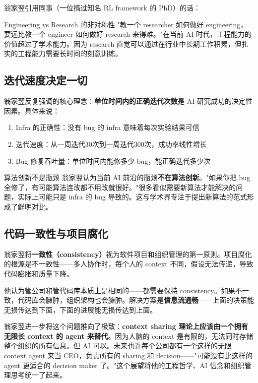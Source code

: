 \documentclass[a4paper]{article}
\begin{document}
翁家翌引用同事（一位搞过知名 RL framework 的 PhD）的话：

\begin{importantbox}{Engineering vs Research 的非对称性}
"教一个 researcher 如何做好 engineering，要远比教一个 engineer 如何做好 research 来得难。"在当前 AI 时代，工程能力的价值超过了学术能力。因为 research 直觉可以通过在行业中长期工作积累，但扎实的工程能力需要长时间的刻意训练。
\end{importantbox}

\subsection{迭代速度决定一切}

翁家翌反复强调的核心理念：\textbf{单位时间内的正确迭代次数}是 AI 研究成功的决定性因素。具体来说：

\begin{enumerate}
    \item Infra 的正确性：没有 bug 的 infra 意味着每次实验结果可信
    \item 迭代速度：从一周迭代30次到一周迭代300次，成功率线性增长
    \item Bug 修复吞吐量：单位时间内能修多少 bug，能正确迭代多少次
\end{enumerate}

\begin{warningbox}{算法创新不是瓶颈}
翁家翌认为当前 AI 前沿的瓶颈\textbf{不在算法创新}。"如果你把 bug 全修了，有可能算法连改都不用改就很好。"很多看似需要新算法才能解决的问题，实际上可能只是 infra 的 bug 导致的。这与学术界专注于提出新算法的范式形成了鲜明对比。
\end{warningbox}

\subsection{代码一致性与项目腐化}

翁家翌将\textbf{一致性（consistency）}视为软件项目和组织管理的第一原则。项目腐化的根源是不一致性——多人协作时，每个人的 context 不同，假设无法传递，导致代码膨胀和质量下降。

他认为管公司和管代码库本质上是相同的——都需要保持 consistency。如果不一致，代码库会臃肿，组织架构也会臃肿。解决方案是\textbf{信息流通畅}——上面的决策能无损传达到下面，下面的进展能无损传达到上面。

翁家翌进一步将这个问题推向了极致：\textbf{context sharing 理论上应该由一个拥有无限长 context 的 agent 来替代}。因为人脑的 context 是有限的，无法同时存储整个组织的所有信息。但 AI 可以。未来也许每个公司都有一个这样的无限 context agent 来当 CEO，负责所有的 sharing 和 decision——"可能没有比这样的 agent 更适合的 decision maker 了。"这个展望将他的工程哲学、AI 信念和组织管理思考统一了起来。
\end{document}
